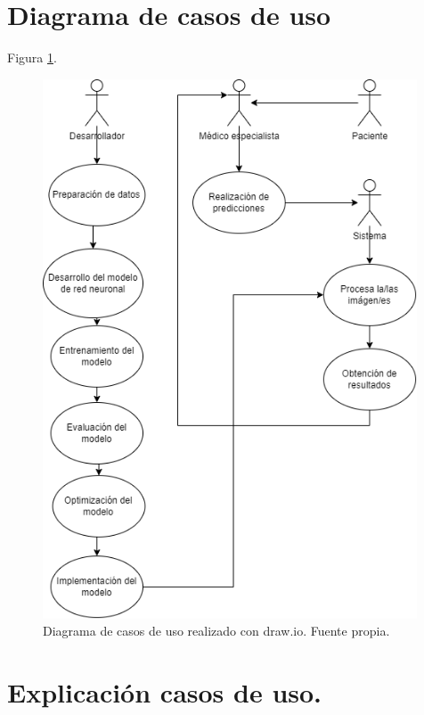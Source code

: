 
\section{Diagrama de casos de uso}

Figura \ref{fig:diagrama_casos_uso}.

\begin{figure}[h]
    \centering
    \includegraphics[width=0.99\textwidth]{img/diagrama_casos_uso.PNG}
    \caption{Diagrama de casos de uso realizado con draw.io. Fuente propia.}
    \label{fig:diagrama_casos_uso}
\end{figure}
\FloatBarrier

\section{Explicación casos de uso.}

